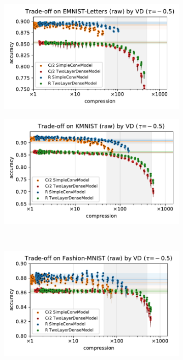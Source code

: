 \documentclass[a4paper,10pt,onecolumn]{article}
\begin{document}
\begin{figure}[b]
  \centering
  \begin{subfigure}[b]{0.5\columnwidth}
    \centering
    \includegraphics[width=\linewidth]{figure__mnist-like__trade-off/appendix__cmp__VD__emnist_letters__raw__-0.5.pdf}
  \end{subfigure}%
  \begin{subfigure}[b]{0.5\columnwidth}
    \centering
    \includegraphics[width=\linewidth]{figure__mnist-like__trade-off/appendix__cmp__VD__kmnist__raw__-0.5.pdf}
  \end{subfigure} \\%
  \begin{subfigure}[b]{0.5\columnwidth}
    \centering
    \includegraphics[width=\linewidth]{figure__mnist-like__trade-off/appendix__cmp__VD__fashionmnist__raw__-0.5.pdf}

\end{subfigure}
\end{figure}
\end{document}

